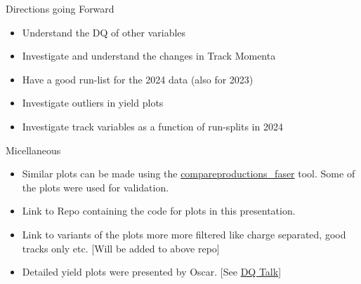 \begin{frame}{Directions going Forward}
    \begin{itemize}
        \item Understand the DQ of other variables
        \item Investigate and understand the changes in Track Momenta
        \item Have a good run-list for the 2024 data (also for 2023)
        \item Investigate outliers in yield plots
        \item Investigate track variables as a function of run-splits in 2024
    \end{itemize}
\end{frame}
\begin{frame}{Micellaneous}
    \begin{itemize}
        \item Similar plots can be made using the \href{https://gitlab.cern.ch/anburger/compareproductions_faser}{compareproductions\_faser} tool. Some of the plots were used for validation.
        \item Link to Repo containing the code for plots in this presentation.
        \item Link to variants of the plots more more filtered like charge separated, good tracks only etc. [Will be added to above repo]
        \item Detailed yield plots were presented by Oscar. [See \href{https://indico.cern.ch/event/1476946/contributions/6220240/attachments/2970435/5227381/DQ2024.pdf}{DQ Talk}]
    \end{itemize}
\end{frame}
